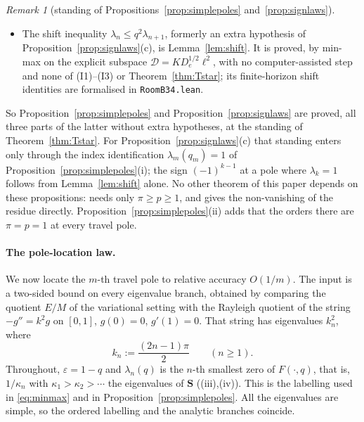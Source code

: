 \documentclass[11pt]{article}
\theoremstyle{plain}
\theoremstyle{definition}
\theoremstyle{remark}
\newtheorem{remark}[theorem]{Remark}
\begin{document}
\begin{remark}[standing of Propositions~\ref{prop:simplepoles} and~\ref{prop:signlaws}]
\begin{itemize}[leftmargin=1.5em,itemsep=0.1em,topsep=0.2em]
Proposition~\ref{prop:simplepoles}\textup{(i)} into the count of $m-1$ sign changes of $R_s$, which
nothing here needs; that count remains unproved here (it is checked numerically for $m\le50$).
The Friedrichs-domain question behind \textup{(I1)} and \textup{(I2)} does not arise either:
$u_s=(KR)_s\to0$ follows from $R\in\ell^1$ (Step~0 of the proof of Theorem~\ref{thm:Tstar}).
\item The shift inequality $\lambda_n\le q^2\lambda_{n+1}$, formerly an extra hypothesis of
Proposition~\ref{prop:signlaws}\textup{(c)}, is Lemma~\ref{lem:shift}. It is proved, by min-max on
the explicit subspace $\mathcal D=KD_e^{1/2}\ell^2$, with no computer-assisted step and none of
\textup{(I1)}--\textup{(I3)} or Theorem~\ref{thm:Tstar}; its finite-horizon shift identities are
formalised in \texttt{RoomB34.lean}.
\end{itemize}
So Proposition~\ref{prop:simplepoles} and Proposition~\ref{prop:signlaws} are proved, all three
parts of the latter without extra hypotheses, at the standing of Theorem~\ref{thm:Tstar}. For
Proposition~\ref{prop:signlaws}\textup{(c)} that standing enters only through the index
identification $\lambda_m(q_m)=1$ of Proposition~\ref{prop:simplepoles}\textup{(i)}; the sign
$(-1)^{k-1}$ at a pole where $\lambda_k=1$ follows from Lemma~\ref{lem:shift} alone.
No other theorem of this paper depends on these propositions:
{\cite[Proposition ``the shape of the local form'', \textup{prop:shape}]{Bonfioli2026bA}} needs only
$\pi\ge p\ge1$, and {\cite[Theorem ``closed form of the junction pairing'', \textup{thm:RJ}]{Bonfioli2026bA}}
gives the non-vanishing of the residue directly. Proposition~\ref{prop:simplepoles}\textup{(ii)}
adds that the orders there are $\pi=p=1$ at every travel pole.
\end{remark}

\paragraph{The pole-location law.} We now locate the $m$-th travel pole to relative accuracy
$O(1/m)$. The input is a two-sided bound on every eigenvalue branch, obtained by comparing the
quotient $E/M$ of the variational setting with the Rayleigh quotient of the string
$-g''=k^2g$ on $[0,1]$, $g(0)=0$, $g'(1)=0$. That string has eigenvalues $k_n^2$, where
\[
   k_n:=\frac{(2n-1)\pi}{2}\qquad(n\ge1).
\]
Throughout, $\varepsilon=1-q$ and $\lambda_n(q)$ is the $n$-th smallest zero of $F(\cdot,q)$, that
is, $1/\kappa_n$ with $\kappa_1>\kappa_2>\cdots$ the eigenvalues of $\mathbf S$
({\cite[Theorem ``the travel determinant'', \textup{thm:fredholm}]{Bonfioli2026bA}}\textup{(iii)},\textup{(iv)}). This is the
labelling used in \eqref{eq:minmax} and in Proposition~\ref{prop:simplepoles}. All the eigenvalues
are simple, so the ordered labelling and the analytic branches coincide.
\end{document}
